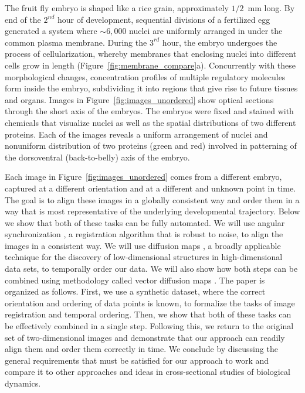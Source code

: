 \documentclass{pnastwo}
\begin{document}
\begin{article}
The fruit fly embryo is shaped like a rice grain, approximately $1/2$~mm long. 
%
By end of the $2^{nd}$ hour of development, sequential divisions of a fertilized egg generated a system where $\sim 6,000$ nuclei are uniformly arranged in under the common plasma membrane. 
%
During the $3^{rd}$ hour, the embryo undergoes the process of cellularization, whereby membranes that enclosing nuclei into different cells grow in length (Figure~\ref{fig:membrane_compare}a). 
%
Concurrently with these morphological changes, concentration profiles of multiple regulatory molecules form inside the embryo, subdividing it into regions that give rise to future tissues and organs. 
%
Images in Figure~\ref{fig:images_unordered} show optical sections through the short axis of the embryos. 
%
The embryos were fixed and stained with chemicals that visualize nuclei as well as the spatial distributions of two different proteins. 
%
Each of the images reveals a uniform arrangement of nuclei and nonuniform distribution of two proteins (green and red) involved in patterning of the dorsoventral (back-to-belly) axis of the embryo. 

Each image in Figure~\ref{fig:images_unordered} comes from a different embryo, captured at a different orientation and at a different and unknown point in time. 
%
The goal is to align these images in a globally consistent way and order them in a way that is most representative of the underlying developmental trajectory. 
%
Below we show that both of these tasks can be fully automated.
%
We will use angular synchronization \cite{singer2011angular}, a registration algorithm that is robust to noise, to align the images in a consistent way.
%
We will use diffusion maps \cite{coifman2005geometric}, a broadly applicable technique for the discovery of low-dimensional structures in high-dimensional data sets, to temporally order our data.
%
We will also show how both steps can be combined using methodology called vector diffusion maps \cite{singer2012vector}.
%
The paper is organized as follows. 
%
First, we use a synthetic dataset, where the correct orientation and ordering of data points is known, to formalize the tasks of image registration and temporal ordering. 
%
Then, we show that both of these tasks can be effectively combined in a single step. 
%
Following this, we return to the original set of two-dimensional images and demonstrate that our approach can readily align them and order them correctly in time. 
%
We conclude by discussing the general requirements that must be satisfied for our approach to work and compare it to other approaches and ideas in cross-sectional studies of biological dynamics. 


\end{article}
\end{document}

